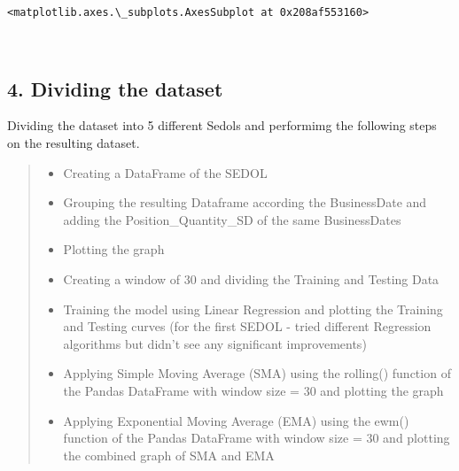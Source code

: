 \documentclass[11pt]{article}
\makeatletter
\providecommand{\tightlist}{%
      \setlength{\itemsep}{0pt}\setlength{\parskip}{0pt}}
\newcommand{\boxspacing}{\kern\kvtcb@left@rule\kern\kvtcb@boxsep}
\newcommand{\prompt}[4]{
        \ttfamily\llap{{\color{#2}[#3]:\hspace{3pt}#4}}\vspace{-\baselineskip}
    }
\makeatother
\begin{document}
            \begin{tcolorbox}[breakable, size=fbox, boxrule=.5pt, pad at break*=1mm, opacityfill=0]
\prompt{Out}{outcolor}{5}{\boxspacing}
\begin{Verbatim}[commandchars=\\\{\}]
<matplotlib.axes.\_subplots.AxesSubplot at 0x208af553160>
\end{Verbatim}
\end{tcolorbox}
        
    \begin{center}
    \end{center}
    { \hspace*{\fill} \\}
    
    \hypertarget{dividing-the-dataset}{%
\subsection{4. Dividing the dataset}\label{dividing-the-dataset}}

Dividing the dataset into 5 different Sedols and performimg the
following steps on the resulting dataset.

\begin{quote}
\begin{itemize}
\tightlist
\item
  Creating a DataFrame of the SEDOL
\item
  Grouping the resulting Dataframe according the BusinessDate and adding
  the Position\_Quantity\_SD of the same BusinessDates
\item
  Plotting the graph
\item
  Creating a window of 30 and dividing the Training and Testing Data
\item
  Training the model using Linear Regression and plotting the Training
  and Testing curves (for the first SEDOL - tried different Regression
  algorithms but didn't see any significant improvements)
\item
  Applying Simple Moving Average (SMA) using the rolling() function of
  the Pandas DataFrame with window size = 30 and plotting the graph
\item
  Applying Exponential Moving Average (EMA) using the ewm() function of
  the Pandas DataFrame with window size = 30 and plotting the combined
  graph of SMA and EMA
\end{itemize}
\end{quote}
\end{document}
